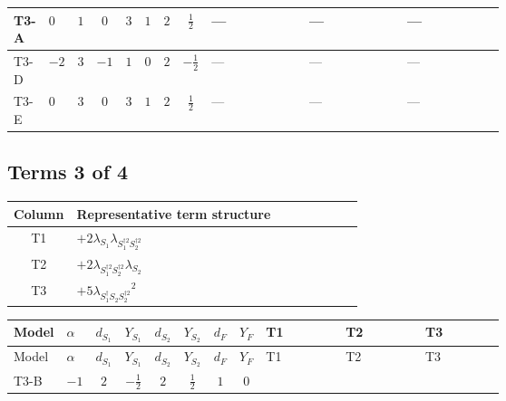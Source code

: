 \documentclass[8pt]{article}
\begin{document}
\begin{landscape}
\begin{longtable}{@{}llcccccc >{\raggedright\arraybackslash}p{0.21\linewidth} >{\raggedright\arraybackslash}p{0.21\linewidth} >{\raggedright\arraybackslash}p{0.21\linewidth}@{}}
\midrule
T3-A & $0$ & $1$ & $0$ & $3$ & $1$ & $2$ & $\frac{1}{2}$ & --- & --- & --- \\
\midrule
T3-D & $-2$ & $3$ & $-1$ & $1$ & $0$ & $2$ & $-\frac{1}{2}$ & --- & --- & --- \\
\midrule
T3-E & $0$ & $3$ & $0$ & $3$ & $1$ & $2$ & $\frac{1}{2}$ & --- & --- & --- \\
\midrule
\bottomrule
\end{longtable}
\clearpage
\subsection*{Terms 3 of 4}
\begin{center}
\begin{tabular}{@{}c >{\raggedright\arraybackslash}p{0.82\linewidth}@{}}
\toprule
Column & Representative term structure \\
\midrule
T1 & \(\displaystyle +2 {\lambda_{S_1}} {\lambda_{S_1^{\dagger 2}S_2^{\dagger 2}}}\) \\
\midrule
T2 & \(\displaystyle +2 {\lambda_{S_1^{\dagger 2}S_2^{\dagger 2}}} {\lambda_{S_2}}\) \\
\midrule
T3 & \(\displaystyle +5 {\lambda_{S_1^\dagger S_2 S_2^{\dagger 2}}}^2\) \\
\midrule
\bottomrule
\end{tabular}
\end{center}
\smallskip
\tiny
\begin{longtable}{@{}llcccccc >{\raggedright\arraybackslash}p{0.21\linewidth} >{\raggedright\arraybackslash}p{0.21\linewidth} >{\raggedright\arraybackslash}p{0.21\linewidth}@{}}
\toprule
Model & $\alpha$ & $d_{S_1}$ & $Y_{S_1}$ & $d_{S_2}$ & $Y_{S_2}$ & $d_F$ & $Y_F$ & T1 & T2 & T3 \\
\midrule
\endfirsthead
\toprule
Model & $\alpha$ & $d_{S_1}$ & $Y_{S_1}$ & $d_{S_2}$ & $Y_{S_2}$ & $d_F$ & $Y_F$ & T1 & T2 & T3 \\
\midrule
\endhead
T3-B & $-1$ & $2$ & $-\frac{1}{2}$ & $2$ & $\frac{1}{2}$ & $1$ & $0$ & \scriptsize\adjustbox{max width=\linewidth}{$\begin{gathered} +2 {\lambda_{S_1}} {\lambda_{S_1^{\dagger 2}S_2^{\dagger 2}}}\end{gathered}$} & \scriptsize\adjustbox{max width=\linewidth}{$\begin{gathered} +2 {\lambda_{S_1^{\dagger 2}S_2^{\dagger 2}}} {\lambda_{S_2}}\end{gathered}$} & \scriptsize\adjustbox{max width=\linewidth}{$\begin{gathered} +5 {\lambda_{S_1^\dagger S_2 S_2^{\dagger 2}}}^2\end{gathered}$} \\

\end{longtable}
\end{landscape}
\end{document}
